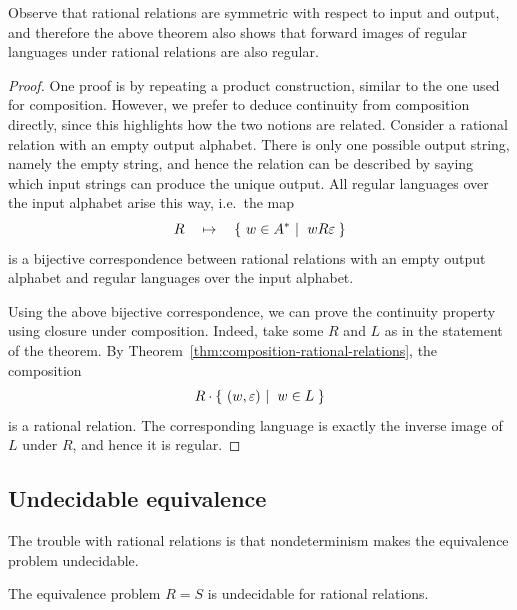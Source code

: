 Observe that rational relations are symmetric with respect to input and output, and therefore the above theorem also shows that forward images of regular languages under rational relations are also regular.
\begin{proof}
    One proof is by repeating a product construction, similar to the one used for composition. However, we prefer to deduce continuity from composition directly, since this highlights how the two notions are related. Consider a rational relation
    with an empty output alphabet. There is only one possible output string, namely the empty string, and hence the relation can be described by saying which input strings can produce the unique output. All regular languages over the input alphabet arise this way, i.e.~the map
    \begin{align*}
    R \quad \mapsto \quad \setbuild{ w \in A^*}{$w R \varepsilon$}
    \end{align*}
    is a bijective correspondence between rational relations with an empty output alphabet and regular languages over the input alphabet.

    Using the above  bijective correspondence, we can prove the continuity property using closure under composition. Indeed, take some $R$ and $L$ as in the statement of the theorem. By Theorem~\ref{thm:composition-rational-relations}, the composition 
    \begin{align*}
    R \cdot \setbuild{(w,\varepsilon)}{$w \in L$}
    \end{align*}
    is a rational relation. The corresponding language is exactly the inverse image of $L$ under $R$, and hence it is regular.
\end{proof}



\subsection{Undecidable equivalence} The trouble with rational relations is that  nondeterminism makes the equivalence problem undecidable.


\begin{theorem}[Griffiths]\label{thm:undecidable-equivalence-rational-relations}
    The equivalence problem $R=S$ is undecidable for rational relations.
\end{theorem}

